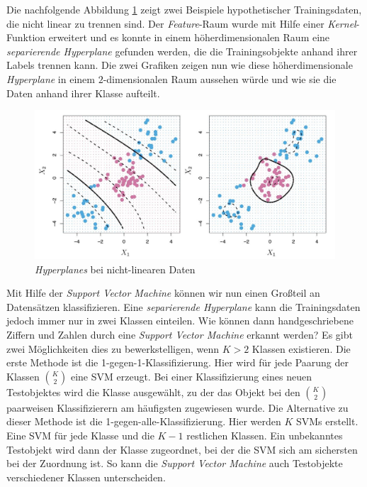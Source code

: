 Die nachfolgende Abbildung \ref{fig:non_linear_data} zeigt zwei Beispiele hypothetischer Trainingsdaten, die nicht linear zu trennen sind.
Der \textit{Feature}-Raum wurde mit Hilfe einer \textit{Kernel}-Funktion erweitert und es konnte in einem höherdimensionalen Raum eine
\textit{separierende Hyperplane} gefunden werden, die die Trainingsobjekte anhand ihrer Labels trennen kann. 
Die zwei Grafiken zeigen nun wie diese höherdimensionale \textit{Hyperplane} in einem $2$-dimensionalen Raum aussehen würde 
und wie sie die Daten anhand ihrer Klasse aufteilt.
\begin{figure}[H]
	\centering
	\includegraphics[width=\imgMed]{images/theory/non_linear_data.jpg}
	\caption{\textit{Hyperplanes} bei nicht-linearen Daten \cite[S. 353]{james_2013}} 
	\label{fig:non_linear_data}
\end{figure}
Mit Hilfe der \textit{Support Vector Machine} können wir nun einen Großteil an Datensätzen klassifizieren. 
Eine \textit{separierende Hyperplane} kann die Trainingsdaten jedoch immer nur in zwei Klassen einteilen. 
Wie können dann handgeschriebene Ziffern und Zahlen durch eine \textit{Support Vector Machine} erkannt werden?
Es gibt zwei Möglichkeiten dies zu bewerkstelligen, wenn $K > 2$ Klassen existieren.
Die erste Methode ist die 1-gegen-1-Klassifizierung. Hier wird für jede Paarung der Klassen $K \choose 2$ eine SVM erzeugt. Bei einer Klassifizierung eines neuen Testobjektes wird die Klasse ausgewählt, zu der das Objekt bei den
$K \choose 2$ paarweisen Klassifizierern am häufigsten zugewiesen wurde.
Die Alternative zu dieser Methode ist die 1-gegen-alle-Klassifizierung. Hier werden $K$ SVMs erstellt.
Eine SVM für jede Klasse und die $K-1$ restlichen Klassen. Ein unbekanntes Testobjekt wird dann der Klasse zugeordnet,
bei der die SVM sich am sichersten bei der Zuordnung ist. 
So kann die \textit{Support Vector Machine} auch Testobjekte verschiedener Klassen unterscheiden.\cite[S. 355f.]{james_2013}\cite[S.1567]{noble_2006}

